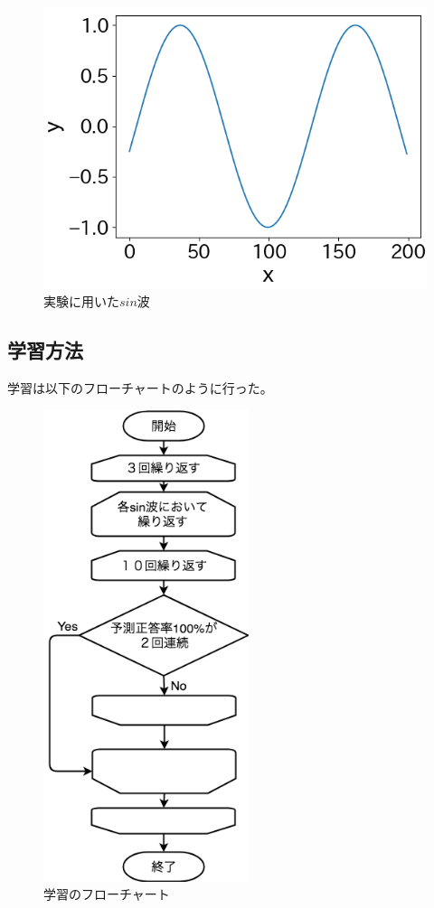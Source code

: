 \begin{figure}[ht]
  \begin{center}
    \includegraphics[width=13cm]{./fig/sin}
    \caption{実験に用いた$sin$波}
    \label{fig:sin}
  \end{center}
\end{figure}

\subsection{学習方法}
学習は以下のフローチャートのように行った。
\begin{figure}[ht]
  \begin{center}
    \includegraphics[width=6cm]{./fig/drawing_flow}
    \caption{学習のフローチャート}
    \label{fig:flow_chart}
  \end{center}
\end{figure}

